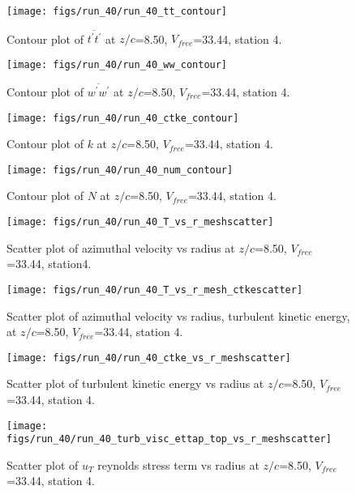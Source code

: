 \begin{figure}[H]
\centering
\texttt{[image: figs/run\_40/run\_40\_tt\_contour]}
\caption{Contour plot of $\overline{t^\prime t^\prime}$ at $z/c$=8.50, $V_{free}$=33.44, station 4.}
\end{figure}


\begin{figure}[H]
\centering
\texttt{[image: figs/run\_40/run\_40\_ww\_contour]}
\caption{Contour plot of $\overline{w^\prime w^\prime}$ at $z/c$=8.50, $V_{free}$=33.44, station 4.}
\end{figure}


\begin{figure}[H]
\centering
\texttt{[image: figs/run\_40/run\_40\_ctke\_contour]}
\caption{Contour plot of $k$ at $z/c$=8.50, $V_{free}$=33.44, station 4.}
\end{figure}


\begin{figure}[H]
\centering
\texttt{[image: figs/run\_40/run\_40\_num\_contour]}
\caption{Contour plot of $N$ at $z/c$=8.50, $V_{free}$=33.44, station 4.}
\end{figure}


\begin{figure}[H]
\centering
\texttt{[image: figs/run\_40/run\_40\_T\_vs\_r\_meshscatter]}
\caption{Scatter plot of azimuthal velocity vs radius at $z/c$=8.50, $V_{free}$=33.44, station4.}
\end{figure}


\begin{figure}[H]
\centering
\texttt{[image: figs/run\_40/run\_40\_T\_vs\_r\_mesh\_ctkescatter]}
\caption{Scatter plot of azimuthal velocity vs radius, turbulent kinetic energy, at $z/c$=8.50, $V_{free}$=33.44, station 4.}
\end{figure}


\begin{figure}[H]
\centering
\texttt{[image: figs/run\_40/run\_40\_ctke\_vs\_r\_meshscatter]}
\caption{Scatter plot of turbulent kinetic energy vs radius at $z/c$=8.50, $V_{free}$=33.44, station 4.}
\end{figure}


\begin{figure}[H]
\centering
\texttt{[image: figs/run\_40/run\_40\_turb\_visc\_ettap\_top\_vs\_r\_meshscatter]}
\caption{Scatter plot of $
u_T$ reynolds stress term vs radius at $z/c$=8.50, $V_{free}$=33.44, station 4.}
\end{figure}


